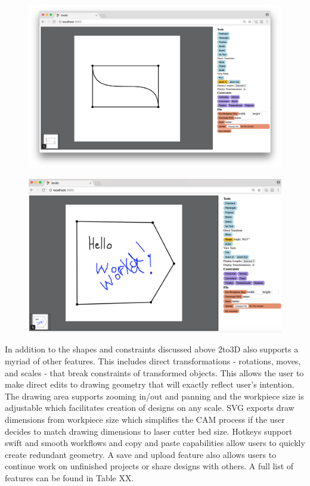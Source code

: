 \begin{figure}[H]
  \includegraphics[width=\linewidth]{screenshot.png}
  \caption{}
  \label{fig:screenshot}
\end{figure}

\begin{figure}[H]
  \includegraphics[width=\linewidth]{screenshot2.png}
  \caption{}
  \label{fig:screenshot2}
\end{figure}

In addition to the shapes and constraints discussed above 2to3D also supports a myriad of other features. This includes direct transformations - rotations, moves, and scales - that break constraints of transformed objects. This allows the user to make direct edits to drawing geometry that will exactly reflect user's intention. The drawing area supports zooming in/out and panning and the workpiece size is adjustable which facilitates creation of designs on any scale. SVG exports draw dimensions from workpiece size which simplifies the CAM process if the user decides to match drawing dimensions to laser cutter bed size. Hotkeys support swift and smooth workflows and copy and paste capabilities allow users to quickly create redundant geometry. A save and upload feature also allows users to continue work on unfinished projects or share designs with others. A full list of features can be found in Table XX.

